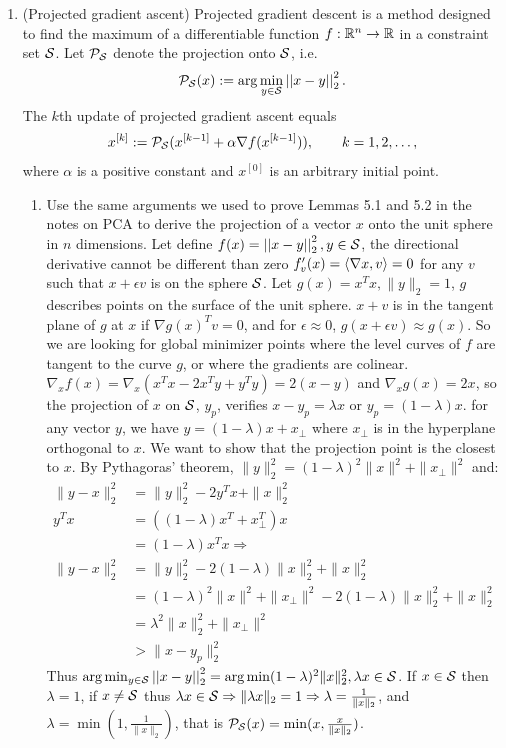 \documentclass[12pt,twoside]{article}
\begin{document}
\begin{enumerate}
\item (Projected gradient ascent) Projected gradient descent is a method designed to find the maximum of a differentiable function $f:\mathbb{R}^n \rightarrow \mathbb{R}$ in a constraint set $\mathcal{ S }$. Let $\mathcal{ P }_{\mathcal{ S }}$ denote the projection onto $\mathcal{ S }$, i.e.
\begin{align}
\mathcal{ P }_{\mathcal{ S }}(x) := \arg \min_{y \in \mathcal{ S }} \left|\left| x-y \right|\right| _{2}^2.
\end{align} 
The $k$th update of projected gradient ascent equals
\begin{align}
x^{[k]} :=\mathcal{ P }_{\mathcal{ S }}( x^{[k-1]} + \alpha \nabla f (x^{[k-1]}) ), \qquad k=1,2,\ldots,
\end{align}
where $\alpha$ is a positive constant and $x^{[0]}$ is an arbitrary initial point.
\begin{enumerate}
\item Use the same arguments we used to prove Lemmas 5.1 and 5.2 in the notes on PCA to derive the projection of a vector $x$ onto the unit sphere in $n$ dimensions.
Let define $f(x) =  \left|\left| x-y \right|\right| _{2}^2,y \in \mathcal{ S }$, the directional derivative cannot be different than zero $f'_v(x) = \left \langle \nabla{x}, v\right \rangle = 0$ for any $v$ such that $x+ \epsilon v$ is on the sphere $\mathcal{ S }$. Let $g(x)=x^T x, \| y \|_2 = 1$, $g$ describes points on the surface of the unit sphere. $x +v$ is in the tangent  plane of $g$ at $x$ if $\nabla{g(x)}^T v = 0$, and for $\epsilon \approx 0$, $g(x + \epsilon v) \approx g(x)$. So we are looking for global minimizer points where the level curves of $f$ are tangent to the curve $g$, or where the gradients are colinear. $\nabla_x{f(x)} = \nabla_x{(x^T x -2 x^T y + y^T y)} = 2 (x-y)$ and $\nabla_x{g(x)} = 2 x$, so the projection of $x$ on $\mathcal{ S }$, $y_p$, verifies $x -y_p = \lambda x$ or $y_p = (1- \lambda) x$. for any vector $y$, we have $y = (1-\lambda) x + x_\bot$ where $x_\bot$ is in the hyperplane orthogonal to $x$. We want to show that the projection point is the closest to $x$.
	By Pythagoras’ theorem, $\|y\|_2^2 = (1-\lambda)^2 \|x\|^2 + \|x_\bot\|^2$ and:
	\begin{align*}
		\|y - x \|_2^2	&=	\|y\|_2^2 -2 y^T x + \| x \|_2^2 \\
		y^Tx			&=	((1-\lambda) x^T + x_\bot^T) x \\
					&=	(1-\lambda) x^T x \Rightarrow \\
		\|y - x \|_2^2	&=	\|y\|_2^2 - 2 (1-\lambda) \|x\|_2^2 + \| x\|_2^2 \\
					&= 	(1-\lambda)^2 \|x\|^2 + \|x_\bot\|^2  - 2 (1-\lambda) \|x\|_2^2 + \| x\|_2^2 \\
					&=	\lambda^2 \| x \|_2^2 + \|x_\bot\|^2 \\	
					&> \| x - y_p \|_2^2
	\end{align*}
	Thus  $\arg \min_{y \in \mathcal{ S }} \left|\left| x-y \right|\right| _{2}^2 =\arg \min  (1-\lambda)^2 \|x\|_2^2, \lambda x  \in \mathcal{ S }$. If $x \in  \mathcal{ S }$ then $\lambda = 1$, 
	if $x \neq \mathcal{ S }$ thus $\lambda x  \in \mathcal{ S } \Rightarrow \|\lambda x \|_2 = 1 \Rightarrow \lambda = \frac{1}{\|x\|_2}$, and $\lambda = \min(1,  \frac{1}{\|x\|_2})$,
	that is $\mathcal{ P }_{\mathcal{ S }}(x) = \min(x, \frac{x}{\|x\|_2})$.



\end{enumerate}
\end{enumerate}
\end{document}
